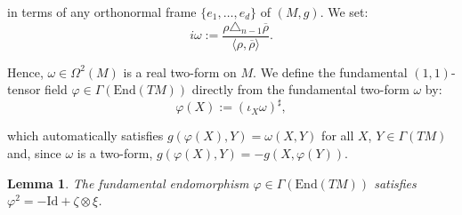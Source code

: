 \documentclass[10pt,a4paper,twoside,reqno]{amsart}
\theoremstyle{plain}
\newtheorem{lemma}[thm]{Lemma}
\theoremstyle{definition}
\theoremstyle{remark}
\def\Id{\mathrm{Id}}
\newcommand{\escal}[1]{\langle#1\rangle}
\begin{document}
\noindent
in terms of any orthonormal frame $\{e_1,\hdots , e_{d}\}$ of $(M,g)$. We set:
\begin{equation*}
i\omega := \frac{\rho\triangle_{n-1}\overline{\rho}}{\escal{\rho,\overline{\rho}}}.
\end{equation*}

\noindent
Hence, $\omega \in \Omega^2(M)$ is a real two-form on $M$. We define the fundamental $(1,1)$-tensor field $\varphi\in\Gamma(\mathrm{End}(TM))$ directly from the fundamental two-form $\omega$ by:
\begin{equation*}
\varphi(X) := (\iota_X\omega)^\sharp,
\end{equation*}

\noindent
which automatically satisfies $g(\varphi(X),Y)=\omega(X,Y)$ for all $X$, $Y\in\Gamma(TM)$ and, since $\omega$ is a two-form, $g(\varphi(X),Y)=-g(X,\varphi(Y))$.

\begin{lemma}\label{lemma:varphi_square}
The fundamental endomorphism $\varphi\in\Gamma(\mathrm{End}(TM))$ satisfies $\varphi^2=-\Id+\zeta\otimes\xi$.
\end{lemma}
\end{document}
